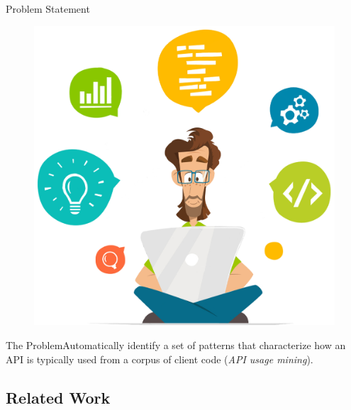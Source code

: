 \documentclass[11pt]{beamer}
\begin{document}
\begin{frame}{Problem Statement}
	\begin{figure}
		\includegraphics[scale=0.25]{TheProblem}
	\end{figure}
	\begin{block}{The Problem}{Automatically identify a set of patterns that characterize how an API is typically used from a corpus of client code (\textit{API usage mining}).}
	\end{block}
\end{frame}

\subsection{Related Work}
\end{document}
